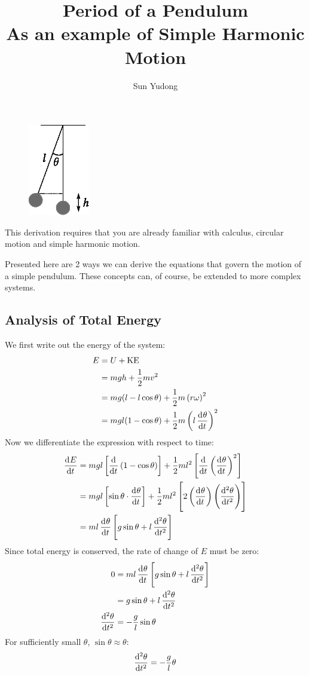 \documentclass[11pt]{article}
\title{Period of a Pendulum\\{\normalsize As an example of Simple Harmonic Motion}}
\author{Sun Yudong}
\begin{document}
	\maketitle
	
	\begin{figure}
		\vspace{-0.5cm}
		\centering
		\includegraphics[height=4cm]{pendulum.eps}
		\vspace{-1cm}
	\end{figure}
	
	This derivation requires that you are already familiar with calculus, circular motion and simple harmonic motion. 
	
	Presented here are 2 ways we can derive the equations that govern the motion of a simple pendulum. These concepts can, of course, be extended to more complex systems.
	
	\subsection*{Analysis of Total Energy}
	We first write out the energy of the system:
	\begin{align*}
	E &= U + \text{KE} \\
	&= mgh + \frac{1}{2}mv^2 \\
	&= mg(l - l\cos \theta ) + \frac{1}{2}m\left(r\omega\right)^2 \\
	&= mgl(1 - \cos \theta ) + \frac{1}{2}m\left(l\dod{\theta}{t}\right)^2
	\end{align*}
	Now we differentiate the expression with respect to time:
	\begin{align*}
	\dod{E}{t} &= mgl\left[\dod{}{t}(1 - \cos \theta)\right] + \frac{1}{2}ml^2\left[\dod{}{t}\left(\dod{\theta}{t}\right)^2\right] \\
	&= mgl\left[\sin \theta \cdot \dod{\theta}{t}\right] + \frac{1}{2}ml^2\left[2\left(\dod{\theta}{t}\right)\left(\dod[2]{\theta}{t}\right)\right] \\
	&= ml\dod{\theta}{t}\left[g\sin \theta + l\dod[2]{\theta}{t}\right]
	\end{align*}
	Since total energy is conserved, the rate of change of $E$ must be zero:
	\begin{align*}
	0 &= ml\dod{\theta}{t}\left[g\sin \theta + l\dod[2]{\theta}{t}\right] \\
	&= g\sin \theta + l\dod[2]{\theta}{t} \\
	\dod[2]{\theta}{t} &= -\frac{g}{l} \sin \theta
	\end{align*}
	For sufficiently small $\theta$, $\sin \theta \approx \theta$:
	\begin{equation}
	\dod[2]{\theta}{t} = -\frac{g}{l}\theta \label{eqn:pendulum}
	\end{equation}
\end{document}
